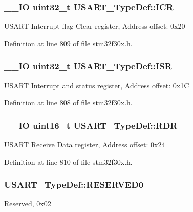 \hypertarget{struct_u_s_a_r_t___type_def_ab6d6dd2af5463e9e3df458557e09f6cf}{
\subsubsection[{I\-C\-R}]{\setlength{\rightskip}{0pt plus 5cm}\-\_\-\-\_\-\-I\-O {\bf uint32\-\_\-t} U\-S\-A\-R\-T\-\_\-\-Type\-Def\-::\-I\-C\-R}}\label{struct_u_s_a_r_t___type_def_ab6d6dd2af5463e9e3df458557e09f6cf}
U\-S\-A\-R\-T Interrupt flag Clear register, Address offset\-: 0x20 

Definition at line 809 of file stm32f30x.\-h.

\hypertarget{struct_u_s_a_r_t___type_def_a79ce09e9fbedb2d169b3a584ed003b02}{
\subsubsection[{I\-S\-R}]{\setlength{\rightskip}{0pt plus 5cm}\-\_\-\-\_\-\-I\-O {\bf uint32\-\_\-t} U\-S\-A\-R\-T\-\_\-\-Type\-Def\-::\-I\-S\-R}}\label{struct_u_s_a_r_t___type_def_a79ce09e9fbedb2d169b3a584ed003b02}
U\-S\-A\-R\-T Interrupt and status register, Address offset\-: 0x1\-C 

Definition at line 808 of file stm32f30x.\-h.

\hypertarget{struct_u_s_a_r_t___type_def_ab38dd649c7ec25ed70fe49791d45668d}{
\subsubsection[{R\-D\-R}]{\setlength{\rightskip}{0pt plus 5cm}\-\_\-\-\_\-\-I\-O {\bf uint16\-\_\-t} U\-S\-A\-R\-T\-\_\-\-Type\-Def\-::\-R\-D\-R}}\label{struct_u_s_a_r_t___type_def_ab38dd649c7ec25ed70fe49791d45668d}
U\-S\-A\-R\-T Receive Data register, Address offset\-: 0x24 

Definition at line 810 of file stm32f30x.\-h.

\hypertarget{struct_u_s_a_r_t___type_def_a84ccd64c74c8dbc78b94172ce759de10}{
\subsubsection[{R\-E\-S\-E\-R\-V\-E\-D0}]{ U\-S\-A\-R\-T\-\_\-\-Type\-Def\-::\-R\-E\-S\-E\-R\-V\-E\-D0}}\label{struct_u_s_a_r_t___type_def_a84ccd64c74c8dbc78b94172ce759de10}
Reserved, 0x02 

